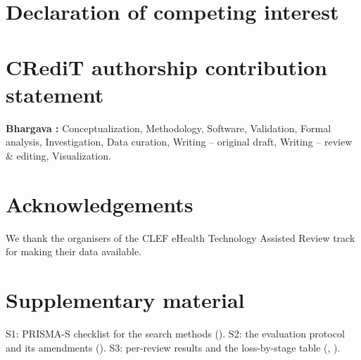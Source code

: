 \section*{Declaration of competing interest}

\section*{CRediT authorship contribution statement}
\textbf{Bhargava :} Conceptualization, Methodology, Software, Validation, Formal analysis,
Investigation, Data curation, Writing -- original draft, Writing -- review \& editing, Visualization.

\section*{Acknowledgements}
We thank the organisers of the CLEF eHealth Technology Assisted Review track for making their data available.

\section*{Supplementary material}
S1: PRISMA-S checklist for the search methods (). S2: the evaluation protocol and
its amendments (). S3: per-review results and the loss-by-stage table
(, ). 
